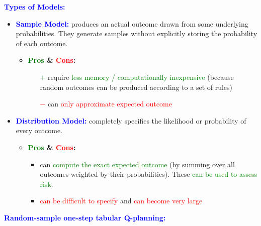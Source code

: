 \documentclass[12pt, a4paper]{article}
\begin{document}
\textbf{\textcolor{blue}{Types of Models:}}
\begin{itemize}
  \item \textbf{\textcolor{blue}{Sample Model:}} produces an actual outcome drawn from some underlying probabilities. They generate samples without explicitly storing the probability of each outcome.
  \begin{itemize}
    \item \textbf{\textcolor{Green}{Pros} \& \textcolor{red}{Cons}:}
    \begin{itemize}
      \item[\textcolor{Green}{$+$}] require \textcolor{Green}{less memory / computationally inexpensive} (because random outcomes can be produced according to a set of rules)
      \item[\textcolor{red}{$-$}] can \textcolor{red}{only approximate expected outcome}
    \end{itemize}
  \end{itemize}
  \item \textbf{\textcolor{blue}{Distribution Model:}} completely specifies the likelihood or probability of every outcome.
  \begin{itemize}
    \item \textbf{\textcolor{Green}{Pros} \& \textcolor{red}{Cons}:}
    \begin{itemize}
      \item can \textcolor{Green}{compute the exact expected outcome} (by summing over all outcomes weighted by their probabilities). These \textcolor{Green}{can be used to assess risk}.
      \item \textcolor{red}{can be difficult to specify} and \textcolor{red}{can become very large}
    \end{itemize}
  \end{itemize}
\end{itemize}




\textbf{\textcolor{blue}{Random-sample one-step tabular Q-planning:}}
\end{document}
